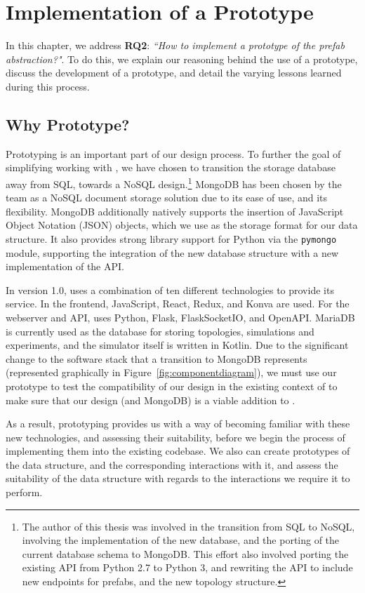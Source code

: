 \documentclass[11pt]{article}
\begin{document}
\section{Implementation of a Prototype} \label{sec:prototype}
	In this chapter, we address \textbf{RQ2}: \textit{``How to implement a prototype of the prefab abstraction?"}.
	To do this, we explain our reasoning behind the use of a prototype, discuss the development of a prototype, and detail the varying lessons learned during this process.
	\subsection{Why Prototype?}
		Prototyping is an important part of our design process.
		To further the goal of simplifying working with \opendc{}, we have chosen to transition the storage database away from SQL, towards a NoSQL design.\footnote{The author of this thesis was involved in the transition from SQL to NoSQL, involving the implementation of the new database, and the porting of the current database schema to MongoDB. 
		This effort also involved porting the existing \opendc{} API from Python 2.7 to Python 3, and rewriting the API to include new endpoints for prefabs, and the new topology structure.}
		MongoDB has been chosen by the \opendc{} team as a NoSQL document storage solution due to its ease of use, and its flexibility.
		MongoDB additionally natively supports the insertion of JavaScript Object Notation (JSON) objects, which we use as the storage format for our data structure.
		It also provides strong library support for Python via the \verb|pymongo| module, supporting the integration of the new database structure with a new implementation of the \opendc{} API.

		In version 1.0, \opendc{} uses a combination of ten different technologies to provide its service.
		In the frontend, JavaScript, React, Redux, and Konva are used. For the webserver and API, \opendc{} uses Python, Flask, FlaskSocketIO, and OpenAPI.
		MariaDB is currently used as the database for storing topologies, simulations and experiments, and the simulator itself is written in Kotlin.
		Due to the significant change to the software stack that a transition to MongoDB represents (represented graphically in Figure~\ref{fig:componentdiagram}), we must use our prototype to test the compatibility of our design in the existing context of \opendc{} to make sure that our design (and MongoDB) is a viable addition to \opendc{}.

		As a result, prototyping provides us with a way of becoming familiar with these new technologies, and assessing their suitability, before we begin the process of implementing them into the existing \opendc{} codebase.
		We also can create prototypes of the data structure, and the corresponding interactions with it, and assess the suitability of the data structure with regards to the interactions we require it to perform.
\end{document}
